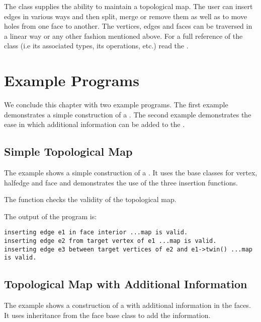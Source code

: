 The class  supplies the ability to maintain
a topological map. The user can insert edges in various ways and then split,
merge or remove them as well as to move holes from one face to another.
The vertices, edges and faces can be traversed in a 
linear way or any other fashion mentioned above.
For a full reference of the class (i.e its associated types,
its operations, etc.) read the .


\section{Example Programs}
\label{TPM_sec:example}
We conclude this chapter with two example programs. The first example
demonstrates a simple construction of a . The 
second example demonstrates the ease in which additional information can
be added to the .

\subsection{Simple Topological Map}
The example shows a simple construction of a .
It uses the base classes for vertex, halfedge and face and demonstrates
the use of the three insertion functions.

The function  checks the validity of the topological map.


The output of the program is:

\begin{verbatim}
inserting edge e1 in face interior ...map is valid.
inserting edge e2 from target vertex of e1 ...map is valid.
inserting edge e3 between target vertices of e2 and e1->twin() ...map is valid.

\end{verbatim}


\subsection{Topological Map with Additional Information}
The example shows a construction of a 
with additional information in the faces. It uses inheritance from the face 
base class to add the information. 

